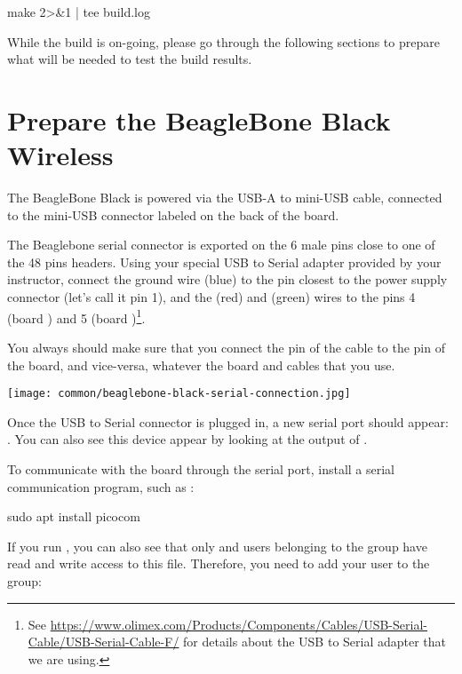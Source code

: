 \begin{bashinput}
make 2>&1 | tee build.log
\end{bashinput}

While the build is on-going, please go through the following sections
to prepare what will be needed to test the build results.

\section{Prepare the BeagleBone Black Wireless}

The BeagleBone Black is powered via the USB-A to mini-USB cable,
connected to the mini-USB connector labeled  on the back of
the board.

The Beaglebone serial connector is exported on the 6 male pins close
to one of the 48 pins headers. Using your special USB to Serial
adapter provided by your instructor, connect the ground wire (blue) to
the pin closest to the power supply connector (let's call it pin 1),
and the  (red) and  (green) wires to the pins 4
(board ) and 5 (board )\footnote{See
  \url{https://www.olimex.com/Products/Components/Cables/USB-Serial-Cable/USB-Serial-Cable-F/}
  for details about the USB to Serial adapter that we are using.}.

You always should make sure that you connect the  pin of the
cable to the  pin of the board, and vice-versa, whatever the
board and cables that you use.

\begin{center}
\texttt{[image: common/beaglebone-black-serial-connection.jpg]}
\end{center}

Once the USB to Serial connector is plugged in, a new serial port
should appear: .  You can also see this device
appear by looking at the output of .

To communicate with the board through the serial port, install a
serial communication program, such as :

\begin{bashinput}
sudo apt install picocom
\end{bashinput}

If you run , you can also see that only
 and users belonging to the  group have read
and write access to this file. Therefore, you need to add your user to
the  group:

